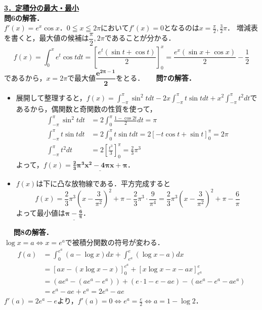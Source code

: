 \documentclass[a4paper,11pt]{ltjsarticle}
\begin{document}
\noindent \underline{{\large{\textbf{3．定積分の最大・最小}}}}
　\\
\noindent\textbf{問6の解答．}\\[5pt]
$\displaystyle{f'(x)=e^x\cos x}$．$\displaystyle{0\leqq x\leqq 2\pi}$において$\displaystyle{f'(x)=0}$となるのは$\displaystyle{x=\frac{\pi}{2}, \frac{3}{2}\pi}$．
増減表を書くと，最大値の候補は$\dfrac\pi2,2\pi$であることが分かる．
\[f\left(x\right)=\int_0^{x}e^t\cos tdt=\left[\frac{e^t(\sin t+\cos t)}{2}\right]_0^{x}=\frac{e^x(\sin x+\cos x)}{2}-\frac12\]
であるから，$x=2\pi$で最大値$\boldsymbol{\dfrac{e^{2\pi-1}}{2}}$をとる．
　
\noindent\textbf{問7の解答．}\\[5pt]
\begin{itemize}
    \item [(1)]展開して整理すると，$\displaystyle{f(x)=\int_{-\pi}^\pi \sin^2 tdt -2x\int_{-\pi}^\pi t\sin tdt +x^2\int_{-\pi}^\pi t^2dt}$であるから，偶関数と奇関数の性質を使って，
    \begin{align*}
        \int_{-\pi}^\pi \sin^2 tdt &= 2\int_0^\pi \frac{1-\cos 2t}{2}dt = \pi\\
        \int_{-\pi}^\pi t\sin tdt &= 2\int_0^\pi t\sin tdt = 2[-t\cos t+\sin t]_0^\pi = 2\pi\\
        \int_{-\pi}^\pi t^2dt &= 2\left[\frac{t^3}{3}\right]_0^\pi = \frac{2}{3}\pi^3
    \end{align*}
    よって，$\displaystyle{f(x)=\underline{\boldsymbol{\frac{2}{3}\pi^3 x^2 -4\pi x +\pi}}}$．
    \item [(2)]$\displaystyle{f(x)}$は下に凸な放物線である．平方完成すると
    \[f(x)=\frac{2}{3}\pi^3\left(x-\frac{3}{\pi^2}\right)^2+\pi-\frac{2}{3}\pi^3\cdot\frac{9}{\pi^4}=\frac{2}{3}\pi^3\left(x-\frac{3}{\pi^2}\right)^2+\pi-\frac{6}{\pi}\]
    よって最小値は$\displaystyle{\underline{\boldsymbol{\pi-\frac{6}{\pi}}}}$．
\end{itemize}
　
\noindent\textbf{問8の解答．}\\[5pt]
$\displaystyle{\log x=a \iff x=e^a}$で被積分関数の符号が変わる．
\begin{align*}
f(a)&=\int_0^{e^a}(a-\log x)dx+\int_{e^a}^e(\log x-a)dx\\
&=[ax-(x\log x-x)]_0^{e^a} + [x\log x-x-ax]_{e^a}^e\\
&=(ae^a - (ae^a-e^a)) + (e\cdot 1-e-ae) - (ae^a-e^a-ae^a)\\
&=e^a - ae + e^a = 2e^a - ae
\end{align*}
$\displaystyle{f'(a)=2e^a-e}$より，$\displaystyle{f'(a)=0 \iff e^a=\frac{e}{2} \iff a=1-\log 2}$．
\end{document}
